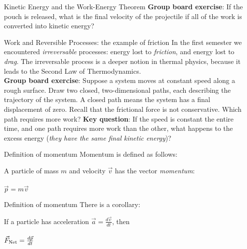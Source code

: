 \documentclass{beamer}
\begin{document}
\begin{frame}{Kinetic Energy and the Work-Energy Theorem}
\textbf{Group board exercise}: If the pouch is released, what is the final velocity of the projectile if all of the work is converted into kinetic energy?
\end{frame}

\begin{frame}{Work and Reversible Processes: the example of friction}
\small
In the first semester we encountered \textit{irreversable} processes: energy lost to \textit{friction}, and energy lost to \textit{drag}. \alert{The irreversable process is a deeper notion in thermal physics}, because it leads to the Second Law of Thermodynamics. \\ \vspace{0.5cm}
\textbf{Group board exercise}: Suppose a system moves at constant speed along a rough surface.  Draw two closed, two-dimensional paths, each describing the trajectory of the system.  A closed path means the system has a final displacement of zero.  Recall that the frictional force is not conservative.  Which path requires more work?  \textbf{Key question}: If the speed is constant the entire time, and one path requires more work than the other, what happens to the excess energy (\textit{they have the same final kinetic energy})?
\end{frame}

\begin{frame}{Definition of momentum}
Momentum is defined as follows: \\ \vspace{1cm}
\begin{tcolorbox}[colback=white,colframe=red!40!blue,title=Definition of Momentum]
\alert{A particle of mass $m$ and velocity $\vec{v}$ has the vector \textit{momentum}:} \\ \\
\alert{$\vec{p} = m\vec{v}$}
\end{tcolorbox}
\end{frame}

\begin{frame}{Definition of momentum}
There is a corollary: \\ \vspace{1cm}
\begin{tcolorbox}[colback=white,colframe=red!40!blue,title=Newton's Second Law with momentum]
\alert{If a particle has acceleration $\vec{a} = \frac{d\vec{v}}{dt}$, then} \\ \\
\alert{$\vec{F}_{\rm Net} = \frac{d\vec{p}}{dt}$}
\end{tcolorbox}
\end{frame}
\end{document}
